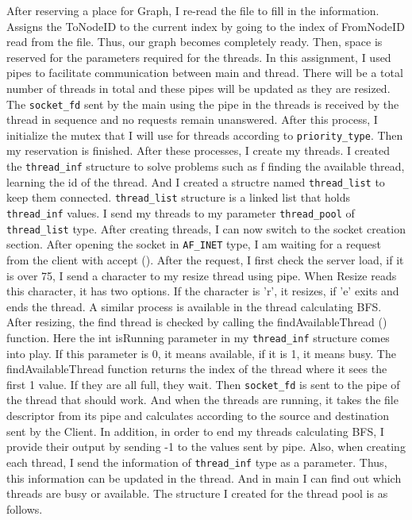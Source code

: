 \documentclass{article}
\begin{document}
After reserving a place for Graph, I re-read the file to fill in the information. Assigns the ToNodeID to the current index by going to the index of FromNodeID read from the file. Thus, our graph becomes completely ready. Then, space is reserved for the parameters required for the threads. In this assignment, I used pipes to facilitate communication between main and thread. There will be a total number of threads in total and these pipes will be updated as they are resized. The \texttt{socket\_fd} sent by the main using the pipe in the threads is received by the thread in sequence and no requests remain unanswered. After this process, I initialize the mutex that I will use for threads according to \texttt{priority\_type}. Then my reservation is finished.
\newline
\newline
After these processes, I create my threads. I created the \texttt{thread\_inf} structure to solve problems such as f finding the available thread, learning the id of the thread. And I created a structre named \texttt{thread\_list} to keep them connected. \texttt{thread\_list} structure is a linked list that holds \texttt{thread\_inf} values. I send my threads to my parameter \texttt{thread\_pool} of \texttt{thread\_list} type. After creating threads, I can now switch to the socket creation section. After opening the socket in \texttt{AF\_INET} type, I am waiting for a request from the client with accept (). After the request, I first check the server load, if it is over 75, I send a character to my resize thread using pipe. When Resize reads this character, it has two options. If the character is 'r', it resizes, if 'e' exits and ends the thread. A similar process is available in the thread calculating BFS. After resizing, the find thread is checked by calling the findAvailableThread () function. Here the int isRunning parameter in my \texttt{thread\_inf} structure comes into play. If this parameter is 0, it means available, if it is 1, it means busy. The findAvailableThread function returns the index of the thread where it sees the first 1 value. If they are all full, they wait. Then \texttt{socket\_fd} is sent to the pipe of the thread that should work. And when the threads are running, it takes the file descriptor from its pipe and calculates according to the source and destination sent by the Client. In addition, in order to end my threads calculating BFS, I provide their output by sending -1 to the values sent by pipe. Also, when creating each thread, I send the information of \texttt{thread\_inf} type as a parameter. Thus, this information can be updated in the thread. And in main I can find out which threads are busy or available. The structure I created for the thread pool is as follows.
\end{document}
